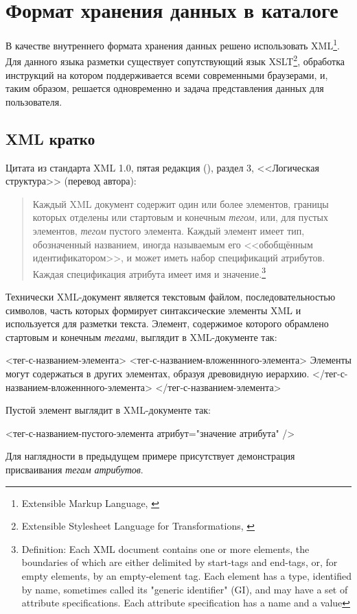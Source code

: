 \documentclass[a4paper,14pt,oneside]{extreport}
\begin{document}
\section{Формат хранения данных в каталоге}
В качестве внутреннего формата хранения данных решено использовать XML\footnote{Extensible Markup Language, \cite{XML-spec}}. Для данного языка разметки существует сопутствующий язык XSLT\footnote{Extensible Stylesheet Language for Transformations, \cite{XSLT-spec}}, обработка инструкций на котором поддерживается всеми современными браузерами, и, таким образом, решается одновременно и задача представления данных для пользователя.

\subsection{XML кратко}
Цитата из стандарта XML 1.0, пятая редакция (\cite{XML-spec}), раздел 3, <<Логическая структура>> (перевод автора):

\begin{quote}
Каждый XML документ содержит один или более элементов, границы которых отделены или стартовым и конечным \textit{тегом}, или, для пустых элементов, \textit{тегом} пустого элемента. Каждый элемент имеет тип, обозначенный названием, иногда называемым его <<обобщённым идентификатором>>, и может иметь набор спецификаций атрибутов. Каждая спецификация атрибута имеет имя и значение.\footnote{Definition: Each XML document contains one or more elements, the boundaries of which are either delimited by start-tags and end-tags, or, for empty elements, by an empty-element tag. Each element has a type, identified by name, sometimes called its "generic identifier" (GI), and may have a set of attribute specifications. Each attribute specification has a name and a value}
\end{quote}

Технически XML-документ является текстовым файлом, последовательностью символов, часть которых формирует синтаксические элементы XML и используется для разметки текста. Элемент, содержимое которого обрамлено стартовым и конечным \textit{тегами}, выглядит в XML-документе так:
\begin{VerbatimCode}
<тег-с-названием-элемента>
	<тег-с-названием-вложеннного-элемента>
		Элементы могут содержаться в других элементах,
		образуя древовидную иерархию.
	</тег-с-названием-вложеннного-элемента>
</тег-с-названием-элемента>
\end{VerbatimCode}

Пустой элемент выглядит в XML-документе так:
\begin{VerbatimCode}
<тег-с-названием-пустого-элемента атрибут="значение атрибута" />
\end{VerbatimCode}
Для наглядности в предыдущем примере присутствует демонстрация присваивания \textit{тегам} \textit{атрибутов}.
\end{document}
